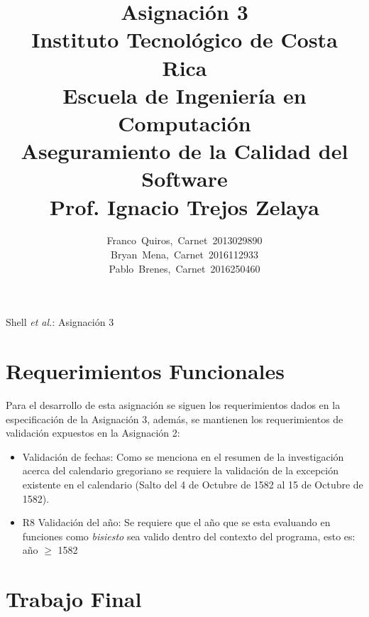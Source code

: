 \documentclass[10pt,journal,compsoc]{IEEEtran}
\begin{document}
	\title{Asignaci\'on 3 \\ \large Instituto Tecnol\'ogico de Costa Rica \\ Escuela de Ingenier\'ia en Computaci\'on\\ Aseguramiento de la Calidad del Software\\ Prof. Ignacio Trejos Zelaya}
	
	
	\author{Franco~Quiros,~Carnet~2013029890\\ Bryan~Mena,~Carnet~2016112933\\ Pablo~Brenes,~Carnet~2016250460}
	
	{Shell \MakeLowercase{\textit{et al.}}: Asignaci\'on 3}
	\maketitle
	
	\IEEEdisplaynontitleabstractindextext
	
	\IEEEpeerreviewmaketitle
	
	\section{Requerimientos Funcionales}
	\par Para el desarrollo de esta asignación se siguen los requerimientos dados en la especificación de la Asignación 3, además, se mantienen los requerimientos de validación expuestos en la Asignación 2:
	\begin{itemize}
		\item Validación de fechas: Como se menciona en el resumen de la investigación acerca del calendario gregoriano se requiere la validación de la excepción existente en el calendario (Salto del 4 de Octubre de 1582 al 15 de Octubre de 1582).
		\item R8 Validación del año: Se requiere que el año que se esta evaluando en funciones como \textit{bisiesto} sea valido dentro del contexto del programa, esto es: año $\geq$ 1582
	\end{itemize}  

\section{Trabajo Final}
\end{document}

